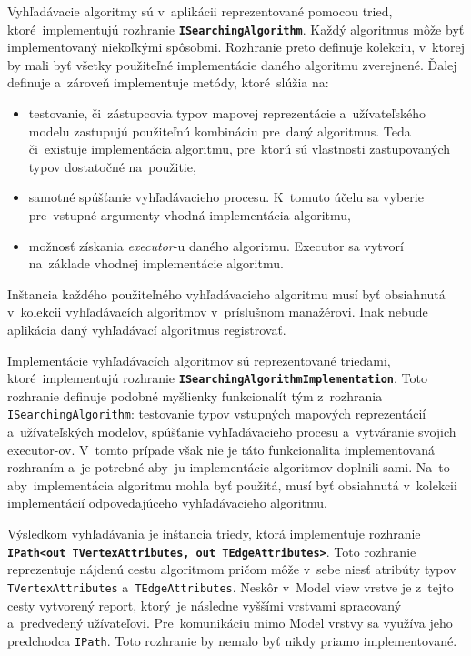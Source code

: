 \bigskip

Vyhľadávacie algoritmy sú v~aplikácii reprezentované pomocou tried, ktoré~implementujú rozhranie \textbf{\texttt{ISearchingAlgorithm}}. Každý algoritmus môže byť implementovaný niekoľkými spôsobmi. Rozhranie preto definuje kolekciu, v~ktorej by mali byť všetky použiteľné implementácie daného algoritmu zverejnené. Ďalej definuje a~zároveň implementuje metódy, ktoré~slúžia na:
\begin{itemize}
    \item testovanie, či~zástupcovia typov mapovej reprezentácie a~užívateľského modelu zastupujú použiteľnú kombináciu pre~daný algoritmus. Teda či~existuje implementácia algoritmu, pre~ktorú sú vlastnosti zastupovaných typov dostatočné na~použitie, 
    \item samotné spúšťanie vyhľadávacieho procesu. K~tomuto účelu sa vyberie pre~vstupné argumenty vhodná implementácia algoritmu,
    \item možnosť získania \textit{executor}-u daného algoritmu. Executor sa vytvorí na~základe vhodnej implementácie algoritmu.
\end{itemize}
Inštancia každého použiteľného vyhľadávacieho algoritmu musí byť obsiahnutá v~kolekcii vyhľadávacích algoritmov v~príslušnom manažérovi. Inak nebude aplikácia daný vyhľadávací algoritmus registrovať. 

Implementácie vyhľadávacích algoritmov sú reprezentované triedami, ktoré~implementujú rozhranie \textbf{\texttt{ISearchingAlgorithmImplementation}}. Toto rozhranie definuje podobné myšlienky funkcionalít tým z~rozhrania \texttt{ISearchingAlgorithm}: testovanie typov vstupných mapových reprezentácií a~užívateľských modelov, spúšťanie vyhľadávacieho procesu a~vytváranie svojich executor-ov. V~tomto prípade však nie je táto funkcionalita implementovaná rozhraním a~je potrebné aby~ju implementácie algoritmov doplnili sami. Na~to aby~implementácia algoritmu mohla byť použitá, musí byť obsiahnutá v~kolekcii implementácií odpovedajúceho vyhľadávacieho algoritmu. 

Výsledkom vyhľadávania je inštancia triedy, ktorá implementuje rozhranie \textbf{\texttt{IPath<out TVertexAttributes, out TEdgeAttributes>}}. Toto rozhranie reprezentuje nájdenú cestu algoritmom pričom môže v~sebe niesť atribúty typov \texttt{TVertexAttributes} a~\texttt{TEdgeAttributes}. Neskôr v~Model view vrstve je z~tejto cesty vytvorený report, ktorý~je následne vyššími vrstvami spracovaný a~predvedený užívateľovi. Pre~komunikáciu mimo Model vrstvy sa využíva jeho predchodca \texttt{IPath}. Toto rozhranie by nemalo byť nikdy priamo implementované. 

